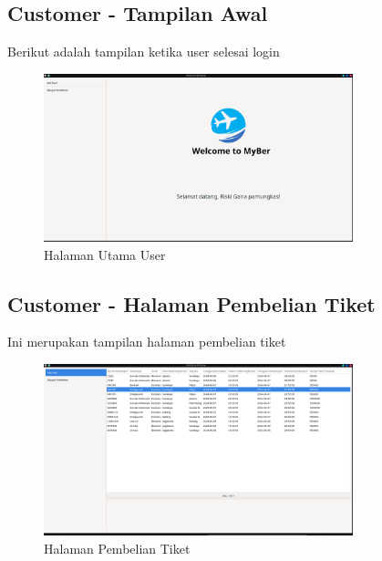 \documentclass[a4paper,12pt]{article}
\begin{document}
\subsection{Customer - Tampilan Awal}
Berikut adalah tampilan ketika user selesai login
\begin{figure}[!htbp]
    \centering
    \includegraphics[width=0.8\textwidth]{./Home_User.png}
    \caption{Halaman Utama User}

\end{figure}
\FloatBarrier 

\subsection{Customer - Halaman Pembelian Tiket}
Ini merupakan tampilan halaman pembelian tiket
\begin{figure}[!htbp]
    \centering
    \includegraphics[width=0.8\textwidth]{./Beli_tiket.png}
    \caption{Halaman Pembelian Tiket}

\end{figure}
\FloatBarrier 
\end{document}

